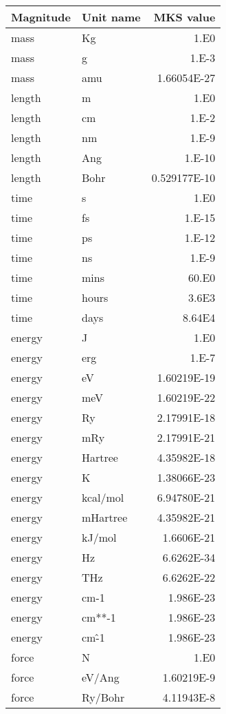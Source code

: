 \documentclass[11pt]{article}
\begin{document}
\begin{center}
\begin{tabular}{llr}
Magnitude & Unit name & MKS value \\ 
\hline  
mass     & Kg         & 1.E0 \\
mass     & g          & 1.E-3 \\
mass     & amu        & 1.66054E-27 \\
length   & m          & 1.E0 \\
length   & cm         & 1.E-2 \\
length   & nm         & 1.E-9 \\
length   & Ang        & 1.E-10 \\
length   & Bohr       & 0.529177E-10 \\
time     & s          & 1.E0 \\
time     & fs         & 1.E-15 \\
time     & ps         & 1.E-12 \\
time     & ns         & 1.E-9 \\
time     & mins       & 60.E0 \\
time     & hours      & 3.6E3 \\
time     & days       & 8.64E4 \\
energy   & J          & 1.E0 \\
energy   & erg        & 1.E-7 \\
energy   & eV         & 1.60219E-19 \\
energy   & meV        & 1.60219E-22 \\
energy   & Ry         & 2.17991E-18 \\
energy   & mRy        & 2.17991E-21 \\
energy   & Hartree    & 4.35982E-18 \\
energy   & K          & 1.38066E-23 \\
energy   & kcal/mol   & 6.94780E-21 \\
energy   & mHartree   & 4.35982E-21 \\
energy   & kJ/mol     & 1.6606E-21 \\
energy   & Hz         & 6.6262E-34 \\
energy   & THz        & 6.6262E-22 \\
energy   & cm-1       & 1.986E-23 \\
energy   & cm**-1     & 1.986E-23 \\
energy   & cm\^-1      & 1.986E-23 \\
force    & N          & 1.E0 \\
force    & eV/Ang     & 1.60219E-9 \\
force    & Ry/Bohr    & 4.11943E-8 \\
\hline
\end{tabular}


\end{center}
\end{document}
